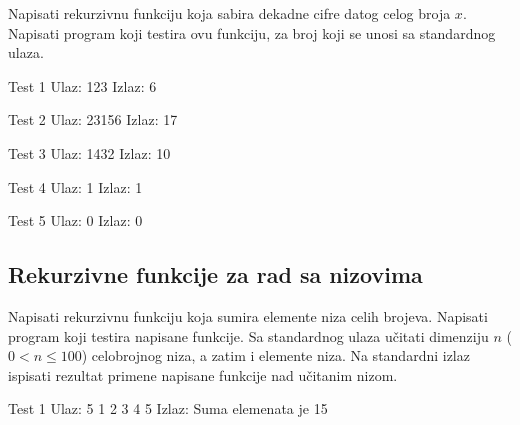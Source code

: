 \begin{Exercise}[label=111]
Napisati rekurzivnu funkciju koja sabira dekadne cifre datog
  celog broja $x$. Napisati program koji testira ovu funkciju, za broj
  koji se unosi sa standardnog ulaza.
  
\begin{minitest}
\begin{test}{Test 1}
Ulaz:    123  
Izlaz:   6 
\end{test}
\end{minitest}
\begin{minitest}
\begin{test}{Test 2}
Ulaz:    23156    
Izlaz:   17 
\end{test}
\end{minitest}
\begin{minitest}
\begin{test}{Test 3}
Ulaz:   1432
Izlaz:   10        
\end{test}
\end{minitest}

\begin{minitest}
\begin{test}{Test 4}
Ulaz:   1       
Izlaz:  1       
\end{test}
\end{minitest}
\begin{minitest}
\begin{test}{Test 5}
Ulaz:   0
Izlaz:  0
\end{test}
\end{minitest}

\end{Exercise}
\begin{Answer}[ref=111]
\end{Answer}



\subsection{Rekurzivne funkcije za rad sa nizovima}

\begin{Exercise}[label=101]
Napisati rekurzivnu funkciju koja sumira elemente niza celih brojeva.  Napisati program koji testira napisane funkcije. Sa standardnog ulaza učitati dimenziju $n$  ($0 < n \leq 100$) celobrojnog
niza, a zatim i elemente niza. Na standardni izlaz ispisati
rezultat primene napisane funkcije nad učitanim
nizom.

\begin{miditest}
\begin{test}{Test 1}
Ulaz:  5 1 2 3 4 5   
Izlaz: Suma elemenata je 15
\end{test}
\end{miditest}

\end{Exercise}
\begin{Answer}[ref=101]
\end{Answer}

